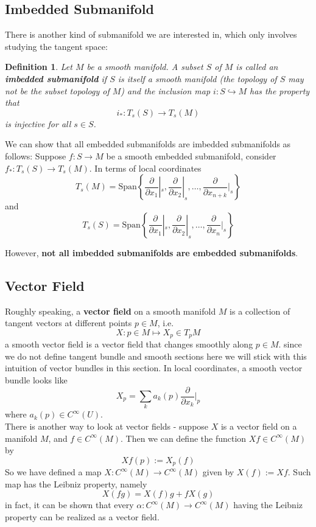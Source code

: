 \documentclass[11pt]{article}
\newtheorem{definition}[theorem]{Definition}
\begin{document}
\subsection{Imbedded Submanifold}
There is another kind of submanifold we are interested in, which only involves studying the tangent space:
\begin{definition}
Let $M$ be a smooth manifold. A subset $S$ of $M$ is called an \textbf{imbedded submanifold} if $S$ is itself a smooth manifold (the topology of $S$ may not be the subset topology of $M$) and the inclusion map $i: S \hookrightarrow M$ has the property that
$$i_* : T_s(S) \to T_s(M)$$
is injective for all $s \in S$.
\end{definition}
We can show that all embedded submanifolds are imbedded submanifolds as follows: Suppose $f: S \to M$ be a smooth embedded submanifold, consider $f_*: T_s(S) \to T_s(M)$. In terms of local coordinates
$$T_s(M) = \mathrm{Span}\left\{ \frac{\partial}{\partial x_1}|_s, \frac{\partial}{\partial x_2}|_s, \dots, \frac{\partial}{\partial x_{n+k}}|_s\right\}$$
and
$$T_s(S) = \mathrm{Span}\left\{ \frac{\partial}{\partial x_1}|_s, \frac{\partial}{\partial x_2}|_s, \dots, \frac{\partial}{\partial x_{n}}|_s\right\}$$

However, \textbf{not all imbedded submanifolds are embedded submanifolds}.

\subsection{Vector Field}
Roughly speaking, a \textbf{vector field} on a smooth manifold $M$ is a collection of tangent vectors at different points $p \in M$, i.e.
$$X: p \in M \mapsto X_p \in T_pM$$
a smooth vector field is a vector field that changes smoothly along $p \in M$. since we do not define tangent bundle and smooth sections here we will stick with this intuition of vector bundles in this section. In local coordinates, a smooth vector bundle looks like
$$X_p = \sum_k a_k(p) \frac{\partial}{\partial x_k}|_p$$
where $a_k(p) \in C^{\infty}(U)$.\\
There is another way to look at vector fields - suppose $X$ is a vector field on a manifold $M$, and $f \in C^{\infty}(M)$. Then we can define the function $Xf \in C^{\infty}(M)$ by
$$Xf(p) := X_p(f)$$
So we have defined a map $X : C^{\infty}(M) \to C^{\infty}(M)$ given by $X(f) := Xf$. Such map has the Leibniz property, namely
$$X(fg) = X(f)g + fX(g)$$
in fact, it can be shown that every $\alpha: C^{\infty}(M) \to C^{\infty}(M)$ having the Leibniz property can be realized as a vector field.
\end{document}
